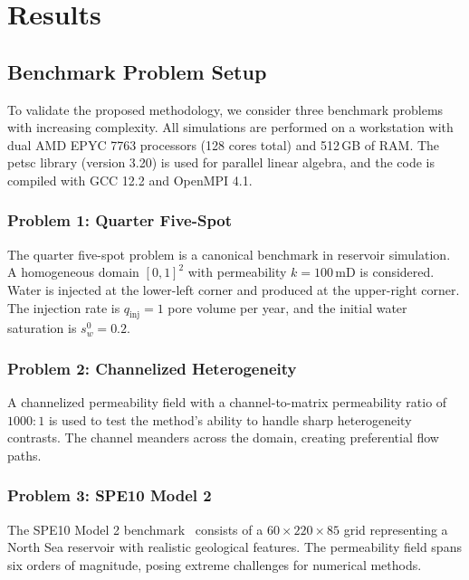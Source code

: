 \chapter{Results}
\label{ch:results}

\section{Benchmark Problem Setup}
\label{sec:results:setup}

To validate the proposed methodology, we consider three benchmark problems with increasing complexity. All simulations are performed on a workstation with dual AMD EPYC 7763 processors (128 cores total) and 512\,GB of RAM. The \gls{petsc} library (version 3.20) is used for parallel linear algebra, and the code is compiled with GCC 12.2 and OpenMPI 4.1.

\subsection{Problem 1: Quarter Five-Spot}
\label{ssec:results:quarterfive}

The quarter five-spot problem is a canonical benchmark in reservoir simulation. A homogeneous domain $[0, 1]^2$ with permeability $k = 100$\,mD is considered. Water is injected at the lower-left corner and produced at the upper-right corner. The injection rate is $q_{\text{inj}} = 1$ pore volume per year, and the initial water saturation is $s_w^0 = 0.2$.

\subsection{Problem 2: Channelized Heterogeneity}
\label{ssec:results:channelized}

A channelized permeability field with a channel-to-matrix permeability ratio of $1000:1$ is used to test the method's ability to handle sharp heterogeneity contrasts. The channel meanders across the domain, creating preferential flow paths.

\subsection{Problem 3: SPE10 Model 2}
\label{ssec:results:spe10}

The SPE10 Model 2 benchmark~\cite{einstein1905} consists of a $60 \times 220 \times 85$ grid representing a North Sea reservoir with realistic geological features. The permeability field spans six orders of magnitude, posing extreme challenges for numerical methods.

